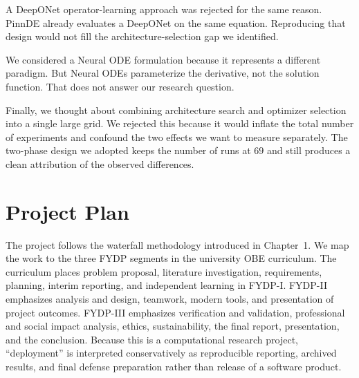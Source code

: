 A DeepONet operator-learning approach was rejected for the same reason. PinnDE already evaluates a DeepONet on the same equation. Reproducing that design would not fill the architecture-selection gap we identified.

We considered a Neural ODE formulation because it represents a different paradigm. But Neural ODEs parameterize the derivative, not the solution function. That does not answer our research question.

Finally, we thought about combining architecture search and optimizer selection into a single large grid. We rejected this because it would inflate the total number of experiments and confound the two effects we want to measure separately. The two-phase design we adopted keeps the number of runs at $69$ and still produces a clean attribution of the observed differences.

\section{Project Plan}

The project follows the waterfall methodology introduced in Chapter~1. We map the work to the three FYDP segments in the university OBE curriculum. The curriculum places problem proposal, literature investigation, requirements, planning, interim reporting, and independent learning in FYDP-I. FYDP-II emphasizes analysis and design, teamwork, modern tools, and presentation of project outcomes. FYDP-III emphasizes verification and validation, professional and social impact analysis, ethics, sustainability, the final report, presentation, and the conclusion. Because this is a computational research project, ``deployment'' is interpreted conservatively as reproducible reporting, archived results, and final defense preparation rather than release of a software product.

